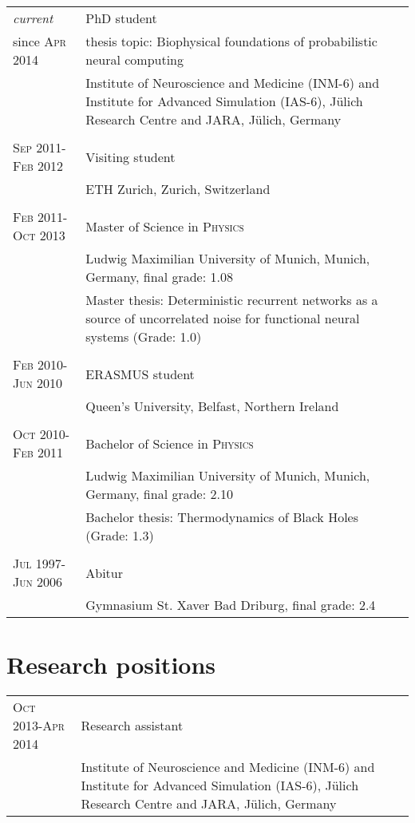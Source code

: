 \documentclass[a4paper,10pt]{article}
\begin{document}
\begin{tabular}{>{\hfill}p{3.15cm}|p{10.4cm}}
  \emph{current} & PhD student \\
  since \textsc{Apr 2014}& \footnotesize thesis topic: Biophysical foundations of probabilistic neural computing \\
  & \footnotesize Institute of Neuroscience and Medicine (INM-6) and Institute for Advanced Simulation (IAS-6), J\"ulich Research Centre and JARA, J\"ulich, Germany \\
  \multicolumn{2}{c}{} \\
  \textsc{Sep} 2011-\textsc{Feb} 2012 & Visiting student \\
  & \footnotesize{ETH Zurich, Zurich, Switzerland} \\
  \multicolumn{2}{c}{} \\
  \textsc{Feb} 2011-\textsc{Oct} 2013 & Master of Science in \textsc{Physics} \\
  & \footnotesize Ludwig Maximilian University of Munich, Munich, Germany, final grade: 1.08 \\
  & \footnotesize Master thesis: Deterministic recurrent networks as
  a source of uncorrelated noise for
  functional neural systems (Grade: 1.0) \\
  \multicolumn{2}{c}{} \\
  \textsc{Feb} 2010-\textsc{Jun} 2010 & ERASMUS student \\
  & \footnotesize Queen's University, Belfast, Northern Ireland \\
  \multicolumn{2}{c}{} \\
  \textsc{Oct} 2010-\textsc{Feb} 2011 & Bachelor of Science in \textsc{Physics} \\
  & \footnotesize Ludwig Maximilian University of Munich, Munich, Germany, final grade: 2.10 \\
  & \footnotesize Bachelor thesis: Thermodynamics of Black Holes (Grade: 1.3) \\
  \multicolumn{2}{c}{} \\
  \textsc{Jul} 1997-\textsc{Jun} 2006 & Abitur \\
  & \footnotesize Gymnasium St. Xaver Bad Driburg, final grade: 2.4
\end{tabular}

\section{Research positions}
\begin{tabular}{>{\hfill}p{3.15cm}|p{10.4cm}}
\textsc{Oct} 2013-\textsc{Apr} 2014 & Research assistant \\
& \footnotesize Institute of Neuroscience and Medicine (INM-6) and Institute for Advanced Simulation (IAS-6), J\"ulich Research Centre and JARA, J\"ulich, Germany\\
\end{tabular}
\end{document}
